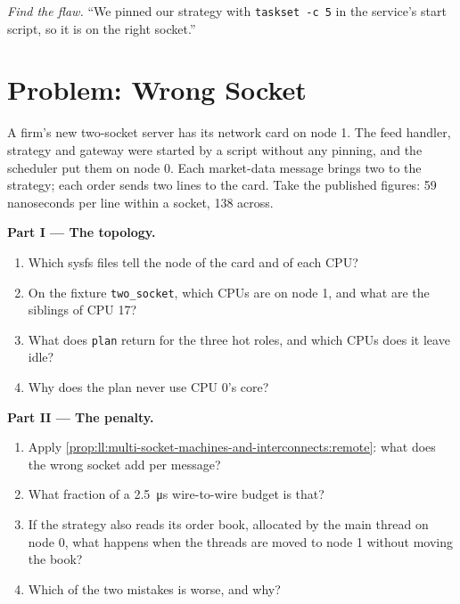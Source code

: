 \begin{exercise}[$\star\star\star$]\label{exo:ll:multi-socket-machines-and-interconnects:8}
\emph{Find the flaw.} ``We pinned our strategy with \texttt{taskset -c 5} in the service's start script, so it is on the
right socket.''
\end{exercise}

\section{Problem: Wrong Socket}

\begin{problem}\label{pb:ll:multi-socket-machines-and-interconnects:1}
A firm's new two-socket server has its network card on node 1. The feed handler, strategy and gateway were started by a
script without any pinning, and the scheduler put them on node 0. Each market-data message brings two  to the
strategy; each order sends two lines to the card. Take the published figures: 59 nanoseconds per line within a socket, 138
across.

\medskip\noindent\textbf{Part I --- The topology.}
\begin{enumerate}
\item Which sysfs files tell the node of the card and of each CPU?
\item On the fixture \texttt{two\_socket}, which CPUs are on node 1, and what are the siblings of CPU 17?
\item What does \texttt{plan} return for the three hot roles, and which CPUs does it leave idle?
\item Why does the plan never use CPU 0's core?
\end{enumerate}

\medskip\noindent\textbf{Part II --- The penalty.}
\begin{enumerate}[resume]
\item Apply \cref{prop:ll:multi-socket-machines-and-interconnects:remote}: what does the wrong socket add per message?
\item What fraction of a \qty{2.5}{\micro\second} wire-to-wire budget is that?
\item If the strategy also reads its order book, allocated by the main thread on node 0, what happens when the threads are
moved to node 1 without moving the book?
\item Which of the two mistakes is worse, and why?
\end{enumerate}


\end{problem}
